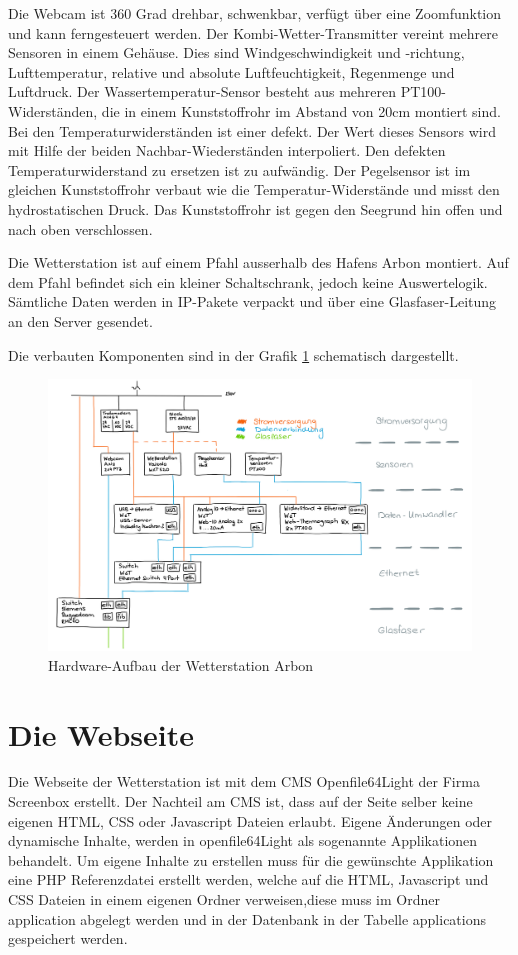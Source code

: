 \documentclass[a4paper,ngerman, 11pt, pagesize]{report}
\begin{document}
Die Webcam ist 360 Grad drehbar, schwenkbar, verfügt über eine Zoomfunktion und kann ferngesteuert werden.  Der Kombi-Wetter-Transmitter vereint mehrere Sensoren in einem Gehäuse. Dies sind Windgeschwindigkeit und -richtung, Lufttemperatur, relative und absolute Luftfeuchtigkeit, Regenmenge und Luftdruck. Der Wassertemperatur-Sensor besteht aus mehreren PT100-Widerständen, die in einem Kunststoffrohr im Abstand von 20cm montiert sind. Bei den Temperaturwiderständen ist einer defekt. Der Wert dieses Sensors wird mit Hilfe der beiden Nachbar-Wiederständen interpoliert. Den defekten Temperaturwiderstand zu ersetzen ist zu aufwändig. Der Pegelsensor ist im gleichen Kunststoffrohr verbaut wie die Temperatur-Widerstände und misst den hydrostatischen Druck. Das Kunststoffrohr ist gegen den Seegrund hin offen und nach oben verschlossen.

Die Wetterstation ist auf einem Pfahl ausserhalb des Hafens Arbon montiert. Auf dem Pfahl befindet sich ein kleiner Schaltschrank, jedoch keine Auswertelogik. Sämtliche Daten werden in IP-Pakete verpackt und über eine Glasfaser-Leitung an den Server gesendet.

Die verbauten Komponenten sind in der Grafik \ref{img:HW-Aufbau} schematisch dargestellt.

\begin{figure}[htbp]
	\centering
	\includegraphics[width=1\linewidth]{img/HW-Aufbau}
	\caption{Hardware-Aufbau der Wetterstation Arbon}
	\label{img:HW-Aufbau}
\end{figure}

  
\section{Die Webseite}
Die Webseite der Wetterstation ist mit dem CMS Openfile64Light der Firma Screenbox erstellt. Der Nachteil am CMS ist, dass auf der Seite selber keine eigenen HTML, CSS oder Javascript Dateien erlaubt. Eigene Änderungen oder dynamische Inhalte, werden in openfile64Light als sogenannte Applikationen behandelt. Um eigene Inhalte zu erstellen muss für die gewünschte Applikation eine PHP Referenzdatei erstellt werden, welche auf die HTML, Javascript und CSS Dateien in einem eigenen Ordner verweisen,diese muss im Ordner application abgelegt werden und in der Datenbank in der Tabelle applications gespeichert werden.\\
\end{document}
